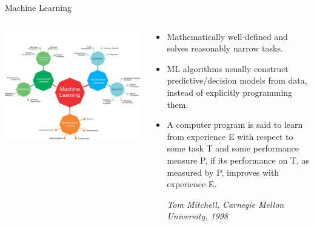 \documentclass[11pt,compress,t,notes=noshow, xcolor=table]{beamer}
\begin{document}
\begin{frame}{Machine Learning}

\begin{columns}
\begin{column}{0.65\textwidth}
\begin{center}
  \includegraphics[trim=0 0 0 0,clip,width=\textwidth]{figure_man/whatisml.png}
\end{center}
\end{column}
\begin{column}{0.45\textwidth}
\begin{footnotesize}
\begin{itemize}
	\item Mathematically well-defined and solves reasonably narrow tasks.
	\item ML algorithms usually construct predictive/decision models from data, instead of explicitly programming them.
    \item A computer program is said to learn from experience E with respect to
  some task T and some performance measure P, if its performance on T, as 
  measured by P, improves with experience E. \\
  \begin{footnotesize}
  \emph{Tom Mitchell, Carnegie Mellon University, 1998}
  \end{footnotesize}
\end{itemize}
\end{footnotesize}
\end{column}
\end{columns}
\lz
  
\end{frame}
\end{document}
